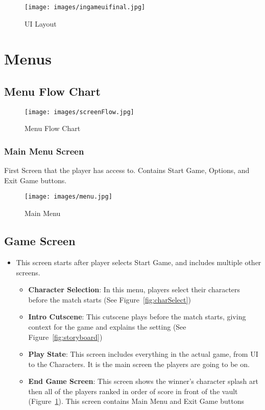 \documentclass[10pt]{report}
\begin{document}
\begin{figure}[H]
	\texttt{[image: images/ingameuifinal.jpg]}
    \caption{UI Layout}
    \label{fig:uilayout}
\end{figure}

\section{Menus}

\subsection{Menu Flow Chart}

\begin{figure}[H]
    \centering
    \texttt{[image: images/screenFlow.jpg]}
    \caption{Menu Flow Chart}
\end{figure}

\subsubsection{Main Menu Screen}

First Screen that the player has access to. Contains Start Game, Options, and Exit Game buttons.

\begin{figure}[H]
    \centering
    \texttt{[image: images/menu.jpg]}
    \caption{Main Menu}
\end{figure}

\subsection{Game Screen}

\begin{itemize}
    \item This screen starts after player selects Start Game, and includes multiple other screens.
    \begin{itemize}    
        \item \textbf{Character Selection}: In this menu, players select their characters before the match starts (See Figure~\ref{fig:charSelect})
        \item \textbf{Intro Cutscene}: This cutscene plays before the match starts, giving context for the game and explains the setting (See Figure~\ref{fig:storyboard})
        \item \textbf{Play State}: This screen includes everything in the actual game, from UI to the Characters. It is the main screen the players are going to be on.
        \item \textbf{End Game Screen}: This screen shows the winner’s character splash art then all of the players ranked in order of score in front of the vault (Figure~\ref{fig:uilayout}). This screen contains Main Menu and Exit Game buttons
    \end{itemize}
\end{itemize}
\end{document}
